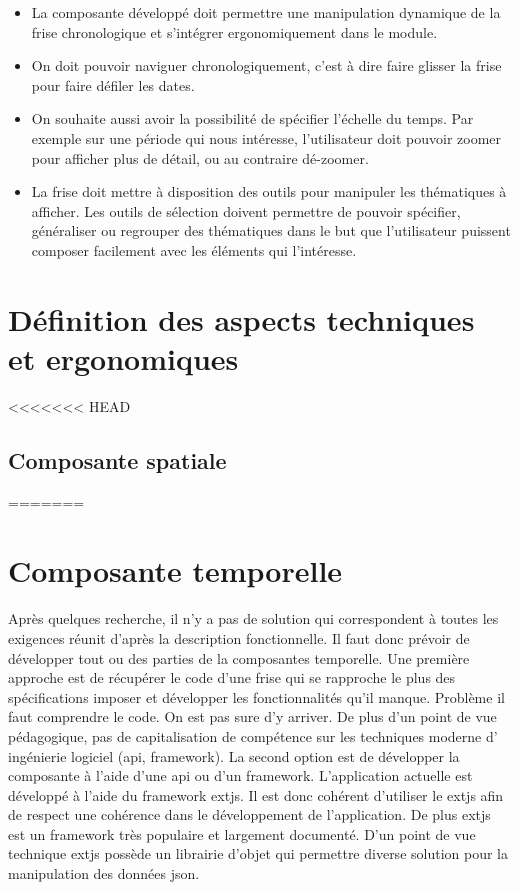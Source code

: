 \begin{itemize}

\item La composante développé doit permettre une manipulation dynamique de la frise chronologique et s'intégrer ergonomiquement dans le module.
\item On doit pouvoir naviguer chronologiquement, c'est à dire faire glisser la frise pour faire défiler les dates.
\item On souhaite aussi avoir la possibilité de spécifier l'échelle du temps. Par exemple sur une période qui nous intéresse, l'utilisateur doit pouvoir zoomer pour afficher plus de détail, ou au contraire dé-zoomer.
\item La frise doit mettre à disposition des outils pour manipuler les thématiques à afficher. Les outils de sélection doivent permettre de pouvoir spécifier, généraliser ou regrouper des thématiques dans le but que l'utilisateur puissent composer facilement avec les éléments qui l'intéresse.
\end{itemize}



\section{Définition des aspects techniques et ergonomiques} \label{Technique}

<<<<<<< HEAD
\subsection{Composante spatiale}
=======
\section{Composante temporelle}
Après quelques recherche, il n'y a pas de solution qui correspondent à toutes les exigences réunit d'après la description fonctionnelle. Il faut donc prévoir de développer tout ou des parties de la composantes temporelle.
Une première approche est de récupérer le code d'une frise qui se rapproche le plus des spécifications imposer et développer les fonctionnalités qu'il manque. Problème il faut comprendre le code. On est pas sure d'y arriver. De plus d'un point de vue pédagogique, pas de capitalisation de compétence sur les techniques moderne d' ingénierie logiciel (api, framework).
La second option est de développer la composante à l'aide d'une api ou d'un framework. L'application actuelle est développé à l'aide du framework extjs. Il est donc cohérent d'utiliser le extjs afin de respect une cohérence dans le développement de l'application. De plus extjs est un framework très populaire et largement documenté. D'un point de vue technique extjs possède un librairie d'objet qui permettre diverse solution pour la manipulation des données json.

